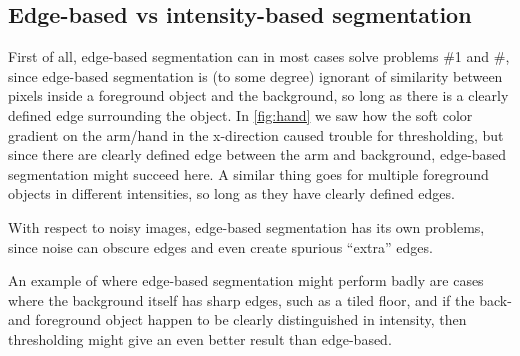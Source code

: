 \subsection{Edge-based vs intensity-based segmentation}

First of all, edge-based segmentation can in most cases solve problems \#1 and
\#, since edge-based segmentation is (to some degree) ignorant of similarity
between pixels inside a foreground object and the background, so long as there
is a clearly defined edge surrounding the object. In \cref{fig:hand} we saw how
the soft color gradient on the arm/hand in the x-direction caused trouble for
thresholding, but since there are clearly defined edge between the arm and
background, edge-based segmentation might succeed here. A similar thing goes for
multiple foreground objects in different intensities, so long as they have
clearly defined edges.

With respect to noisy images, edge-based segmentation has its own problems,
since noise can obscure edges and even create spurious ``extra'' edges.

An example of where edge-based segmentation might perform badly are cases where
the background itself has sharp edges, such as a tiled floor, and if the back-
and foreground object happen to be clearly distinguished in intensity, then
thresholding might give an even better result than edge-based.

